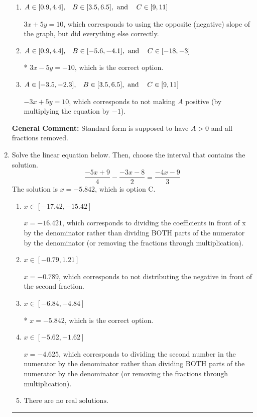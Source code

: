 \documentclass{extbook}[14pt]
\newcommand{\litem}[1]{\item #1

\rule{\textwidth}{0.4pt}}
\begin{document}
\begin{enumerate}
{\begin{enumerate}[label=\Alph*.]
 $-0.6x + 1y = 2.0$, which corresponds to not removing rational values for Standard Form.
\item \( A \in [0.9, 4.4], \hspace{3mm} B \in [3.5, 6.5], \text{ and } \hspace{3mm} C \in [9, 11] \)

 $3x + 5y = 10$, which corresponds to using the opposite (negative) slope of the graph, but did everything else correctly.
\item \( A \in [0.9, 4.4], \hspace{3mm} B \in [-5.6, -4.1], \text{ and } \hspace{3mm} C \in [-18, -3] \)

* $3x - 5y = -10$, which is the correct option.
\item \( A \in [-3.5, -2.3], \hspace{3mm} B \in [3.5, 6.5], \text{ and } \hspace{3mm} C \in [9, 11] \)

 $-3x + 5y = 10$, which corresponds to not making $A$ positive (by multiplying the equation by $-1$).
\end{enumerate}

\textbf{General Comment:} Standard form is supposed to have $A > 0$ and all fractions removed.
}
\litem{
Solve the linear equation below. Then, choose the interval that contains the solution.
\[ \frac{-5x + 9}{4} - \frac{-3x -8}{2} = \frac{-4x -9}{3} \]
The solution is \( x = -5.842 \), which is option C.\begin{enumerate}[label=\Alph*.]
\item \( x \in [-17.42, -15.42] \)

 $x = -16.421$, which corresponds to dividing the coefficients in front of x by the denominator rather than dividing BOTH parts of the numerator by the denominator (or removing the fractions through multiplication).
\item \( x \in [-0.79, 1.21] \)

 $x = -0.789$, which corresponds to not distributing the negative in front of the second fraction.
\item \( x \in [-6.84, -4.84] \)

* $x = -5.842$, which is the correct option.
\item \( x \in [-5.62, -1.62] \)

 $x = -4.625$, which corresponds to dividing the second number in the numerator by the denominator rather than dividing BOTH parts of the numerator by the denominator (or removing the fractions through multiplication).
\item \( \text{There are no real solutions.} \)


\end{enumerate}}
\end{enumerate}
\end{document}
